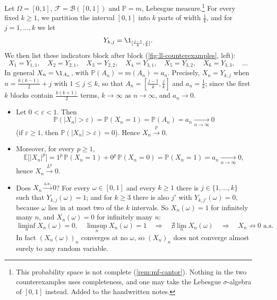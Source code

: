 \begin{example}\label{exa:ll-typewriter}
Let $\Omega=[0,1]$, $\mathcal F=\mathcal B([0,1])$ and $\mathbb P=m$, Lebesgue
measure.\footnote{This probability space is not complete (\cref{rem:mf-cantor}). Nothing in the
two counterexamples uses completeness, and one may take the Lebesgue $\sigma$-algebra of $[0,1]$
instead. Added to the handwritten notes.} For every fixed $k\ge1$, we partition the interval $[0,1]$ into $k$ parts of width
$\frac1k$, and for $j=1,\dots,k$ we let
\[
  Y_{k,j}=\1_{[\frac{j-1}k,\frac jk]} .
\]
We then list these indicators block after block (\cref{fig:ll-counterexamples}, left):
\[
  X_1=Y_{1,1},\quad X_2=Y_{2,1},\quad X_3=Y_{2,2},\quad X_4=Y_{3,1},\quad X_5=Y_{3,2},\quad
  X_6=Y_{3,3},\quad\dots
\]
In general $X_n=\1_{A_n}$, with $\mathbb P(A_n)=m(A_n)=a_n$. Precisely, $X_n=Y_{k,j}$ when
$n=\frac{k(k-1)}2+j$ with $1\le j\le k$, so that $A_n=[\frac{j-1}k,\frac jk]$ and $a_n=\frac1k$;
since the first $k$ blocks contain $\frac{k(k+1)}2$ terms, $k\to\infty$ as $n\to\infty$, and
$a_n\to0$.
\begin{itemize}
  \item Let $0<\varepsilon<1$. Then
    \[
      \mathbb P(|X_n|>\varepsilon)=\mathbb P(X_n=1)=\mathbb P(A_n)=a_n\xrightarrow[n\to\infty]{}0
    \]
    (if $\varepsilon\ge1$, then $\mathbb P(|X_n|>\varepsilon)=0$). Hence $X_n\xrightarrow{\mathbb P}0$.
  \item Moreover, for every $p\ge1$,
    \[
      \mathbb E\big[|X_n|^p\big]=1^p\,\mathbb P(X_n=1)+0^p\,\mathbb P(X_n=0)=\mathbb P(X_n=1)=a_n
      \xrightarrow[n\to\infty]{}0 ,
    \]
    hence $X_n\xrightarrow{L^p}0$.
  \item Does $X_n\xrightarrow{\text{a.s.}}0$? For every $\omega\in[0,1]$ and every $k\ge1$ there is
    $j\in\{1,\dots,k\}$ such that $Y_{k,j}(\omega)=1$; and for $k\ge3$ there is also $j'$ with
    $Y_{k,j'}(\omega)=0$, because $\omega$ lies in at most two of the $k$ intervals. So
    $X_n(\omega)=1$ for infinitely many $n$, and $X_n(\omega)=0$ for infinitely many $n$:
    \[
      \liminf_nX_n(\omega)=0,\quad\limsup_nX_n(\omega)=1
      \quad\Longrightarrow\quad\nexists\lim_nX_n(\omega)
      \quad\Longrightarrow\quad X_n\not\to0\text{ a.s.}
    \]
    In fact $(X_n(\omega))_n$ converges at no $\omega$, so $(X_n)_n$ does not converge almost
    surely to any random variable.
\end{itemize}
\end{example}


